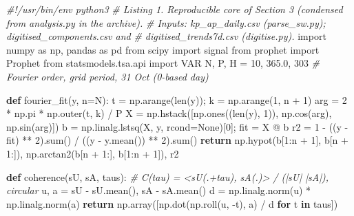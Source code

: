 \documentclass[
  10pt,
  a4paper,
]{article}
\newenvironment{Shaded}{}{}
\newcommand{\BuiltInTok}[1]{#1}
\newcommand{\CommentTok}[1]{\textit{#1}}
\newcommand{\ControlFlowTok}[1]{\textbf{#1}}
\newcommand{\DecValTok}[1]{#1}
\newcommand{\FloatTok}[1]{#1}
\newcommand{\ImportTok}[1]{#1}
\newcommand{\KeywordTok}[1]{\textbf{#1}}
\newcommand{\NormalTok}[1]{#1}
\newcommand{\OperatorTok}[1]{#1}
\newcommand{\VariableTok}[1]{#1}
\begin{document}
\begin{Shaded}
\begin{Highlighting}[]
\CommentTok{\#!/usr/bin/env python3}
\CommentTok{\# Listing 1. Reproducible core of Section 3 (condensed from analysis.py in the archive).}
\CommentTok{\# Inputs: kp\_ap\_daily.csv (parse\_sw.py); digitised\_components.csv and}
\CommentTok{\#         digitised\_trends7d.csv (digitise.py).}
\ImportTok{import}\NormalTok{ numpy }\ImportTok{as}\NormalTok{ np, pandas }\ImportTok{as}\NormalTok{ pd}
\ImportTok{from}\NormalTok{ scipy }\ImportTok{import}\NormalTok{ signal}
\ImportTok{from}\NormalTok{ prophet }\ImportTok{import}\NormalTok{ Prophet}
\ImportTok{from}\NormalTok{ statsmodels.tsa.api }\ImportTok{import}\NormalTok{ VAR}
\NormalTok{N, P, H }\OperatorTok{=} \DecValTok{10}\NormalTok{, }\FloatTok{365.0}\NormalTok{, }\DecValTok{303}          \CommentTok{\# Fourier order, grid period, 31 Oct (0{-}based day)}

\KeywordTok{def}\NormalTok{ fourier\_fit(y, n}\OperatorTok{=}\NormalTok{N):}
\NormalTok{    t }\OperatorTok{=}\NormalTok{ np.arange(}\BuiltInTok{len}\NormalTok{(y))}\OperatorTok{;}\NormalTok{ k }\OperatorTok{=}\NormalTok{ np.arange(}\DecValTok{1}\NormalTok{, n }\OperatorTok{+} \DecValTok{1}\NormalTok{)}
\NormalTok{    arg }\OperatorTok{=} \DecValTok{2} \OperatorTok{*}\NormalTok{ np.pi }\OperatorTok{*}\NormalTok{ np.outer(t, k) }\OperatorTok{/}\NormalTok{ P}
\NormalTok{    X }\OperatorTok{=}\NormalTok{ np.hstack([np.ones((}\BuiltInTok{len}\NormalTok{(y), }\DecValTok{1}\NormalTok{)), np.cos(arg), np.sin(arg)])}
\NormalTok{    b }\OperatorTok{=}\NormalTok{ np.linalg.lstsq(X, y, rcond}\OperatorTok{=}\VariableTok{None}\NormalTok{)[}\DecValTok{0}\NormalTok{]}\OperatorTok{;}\NormalTok{ fit }\OperatorTok{=}\NormalTok{ X }\OperatorTok{@}\NormalTok{ b}
\NormalTok{    r2 }\OperatorTok{=} \DecValTok{1} \OperatorTok{{-}}\NormalTok{ ((y }\OperatorTok{{-}}\NormalTok{ fit) }\OperatorTok{**} \DecValTok{2}\NormalTok{).}\BuiltInTok{sum}\NormalTok{() }\OperatorTok{/}\NormalTok{ ((y }\OperatorTok{{-}}\NormalTok{ y.mean()) }\OperatorTok{**} \DecValTok{2}\NormalTok{).}\BuiltInTok{sum}\NormalTok{()}
    \ControlFlowTok{return}\NormalTok{ np.hypot(b[}\DecValTok{1}\NormalTok{:n }\OperatorTok{+} \DecValTok{1}\NormalTok{], b[n }\OperatorTok{+} \DecValTok{1}\NormalTok{:]), np.arctan2(b[n }\OperatorTok{+} \DecValTok{1}\NormalTok{:], b[}\DecValTok{1}\NormalTok{:n }\OperatorTok{+} \DecValTok{1}\NormalTok{]), r2}

\KeywordTok{def}\NormalTok{ coherence(sU, sA, taus):      }\CommentTok{\# C(tau) = \textless{}sU(.+tau), sA(.)\textgreater{} / (|sU| |sA|), circular}
\NormalTok{    u, a }\OperatorTok{=}\NormalTok{ sU }\OperatorTok{{-}}\NormalTok{ sU.mean(), sA }\OperatorTok{{-}}\NormalTok{ sA.mean()}
\NormalTok{    d }\OperatorTok{=}\NormalTok{ np.linalg.norm(u) }\OperatorTok{*}\NormalTok{ np.linalg.norm(a)}
    \ControlFlowTok{return}\NormalTok{ np.array([np.dot(np.roll(u, }\OperatorTok{{-}}\NormalTok{t), a) }\OperatorTok{/}\NormalTok{ d }\ControlFlowTok{for}\NormalTok{ t }\KeywordTok{in}\NormalTok{ taus])}


\end{Highlighting}
\end{Shaded}
\end{document}
